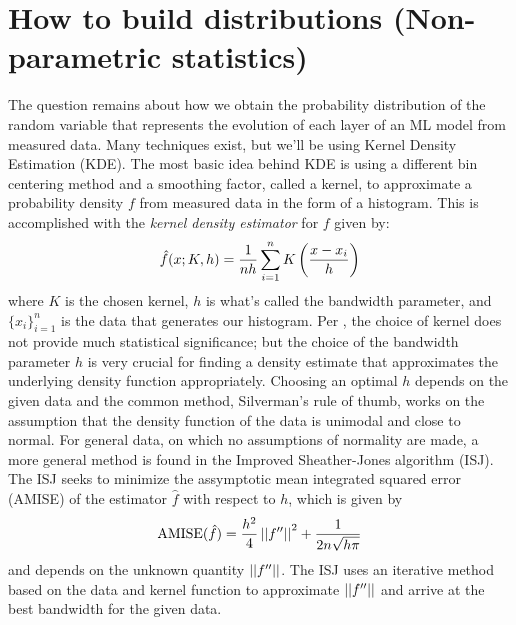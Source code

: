 \section{How to build distributions (Non-parametric statistics)}
The question remains about how we obtain the probability distribution of the random 
variable that represents the evolution of each layer of an ML model from measured data. 
Many techniques exist, but we'll be using Kernel Density Estimation (KDE). The most 
basic idea behind KDE is using a different bin centering method and a smoothing factor, 
called a kernel, to approximate a probability density $f$ from measured data in the form 
of a histogram. This is accomplished with the \emph{kernel density estimator} for $f$
given by:
$$\hat{f}(x; K, h) = \frac{1}{nh}\sum_{i = 1}^n K\left(\frac{x - x_i}{h}\right)$$
where $K$ is the chosen kernel, $h$ is what's called the bandwidth parameter, and 
$\{x_i\}_{i=1}^n$ is the data that generates our histogram. Per \cite{epanechnikov}, 
the choice of kernel does not provide much statistical significance; but the choice of 
the bandwidth parameter $h$ is very crucial for finding a density estimate that 
approximates the 
underlying density function appropriately. Choosing an optimal $h$ depends on 
the given data and the common method, Silverman's rule of thumb, works on the 
assumption that the density function of the data is unimodal and close to 
normal. For general data, on which no assumptions of normality are made, a more 
general method is found in the Improved Sheather-Jones algorithm (ISJ)\cite{botev}. 
The ISJ seeks to minimize the assymptotic mean integrated squared error (AMISE) of 
the estimator $\hat{f}$ with respect to $h$, which is given by 
\begin{equation}
    \text{AMISE}(\hat{f}) = \frac{h^2}{4}\left|\left|f''\right|\right|^2 + \frac{1}{2n\sqrt{h\pi}}
\end{equation}
and depends on the unknown quantity $\left|\left|f''\right|\right|$. The ISJ uses an iterative method 
based on the data and kernel function to approximate $\left|\left|f''\right|\right|$ and arrive at 
the best bandwidth for the given data.


